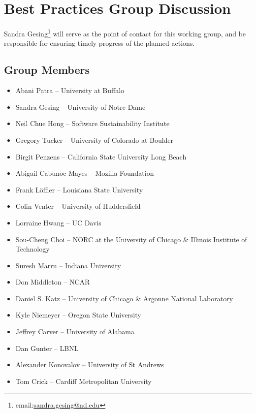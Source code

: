 \section{Best Practices Group Discussion}
\label{sec:appendix_best_practices}

Sandra Gesing\footnote{email:\href{mailto:sandra.gesing@nd.edu}{sandra.gesing@nd.edu}} will serve as
the point of contact for this working group, and be responsible for ensuring timely progress of the planned actions.

\subsection{Group Members}

\begin{itemize}
\item Abani Patra -- University at Buffalo
\item Sandra Gesing -- University of Notre Dame
\item Neil Chue Hong -- Software Sustainability Institute
\item Gregory Tucker -- University of Colorado at Boulder
\item Birgit Penzens -- California State University Long Beach
\item Abigail Cabunoc Mayes -- Mozilla Foundation
\item Frank L\"{o}ffler -- Louisiana State University 
\item Colin Venter --  University of Huddersfield
\item Lorraine Hwang -- UC Davis 
\item Sou-Cheng Choi -- NORC at the University of Chicago \&  Illinois Institute of Technology
\item Suresh Marru -- Indiana University
\item Don Middleton -- NCAR 
\item Daniel S. Katz --  University of Chicago \& Argonne National Laboratory
\item Kyle Niemeyer -- Oregon State University
\item Jeffrey Carver -- University of Alabama
\item Dan Gunter -- LBNL
\item Alexander Konovalov -- University of St Andrews
\item Tom Crick --  Cardiff Metropolitan University

\end{itemize}

